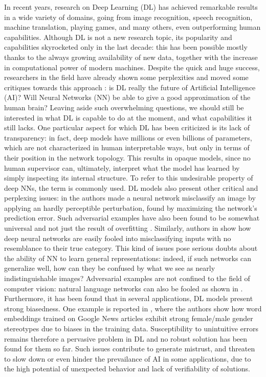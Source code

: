 In recent years, research on Deep Learning (DL) has achieved remarkable results in a wide variety of domains, going from image recognition, speech recognition, machine translation, playing games, and many others, even outperforming human capabilities. Although DL is not a new research topic, its popularity and capabilities skyrocketed only in the last decade: this has been possible mostly thanks to the always growing availability of new data, together with the increase in computational power of modern machines.
Despite the quick and huge success, researchers in the field have already shown some perplexities and moved some critiques towards this approach \cite{marcus2018appraisal,sabour2017dynamic}: is DL really the future of Artificial Intelligence (AI)? Will Neural Networks (NN) be able to give a good approximation of the human brain? Leaving aside such overwhelming questions, we should still be interested in what DL is capable to do at the moment, and what capabilities it still lacks.
One particular aspect for which DL has been criticized is its lack of transparency: in fact, deep models have millions or even billions of parameters, which are not characterized in human interpretable ways, but only in terms of their position in the network topology. This results in opaque models, since no human supervisor can, ultimately, interpret what the model has learned by simply inspecting its internal structure. To refer to this undesirable property of deep NNs, the term  is commonly used. DL models also present other critical and perplexing issues: in \cite{szegedy2013intriguing} the authors made a neural network misclassify an image by applying an hardly perceptible perturbation, found by maximizing the network’s prediction error. Such adversarial examples have also been found to be somewhat universal and not just the result of overfitting \cite{buckner2020adversarial}. Similarly, authors in \cite{nguyen2015fooled} show how deep neural networks are easily fooled into misclassifying inputs with no resemblance to their true category. This kind of issues pose serious doubts about the ability of NN to learn general representations: indeed, if such networks can generalize well, how can they be confused by what we see as nearly indistinguishable images?  Adversarial examples are not confined to the field of computer vision: natural language networks can also be fooled as shown in \cite{jia2017adversarial,zhang2019generating}. Furthermore, it has been found that in several applications, DL models present strong biasedness. One example is reported in \cite{bolukbasi2016debiasing}, where the authors show how word embeddings trained on Google News articles exhibit strong female/male gender stereotypes due to biases in the training data. Susceptibility to unintuitive errors remains therefore a pervasive problem in DL and no robust solution has been found for them so far. Such issues contribute to generate mistrust, and threaten to slow down or even hinder the prevailance of AI in some applications, due to the high potential of unexpected behavior and lack of verifiability of solutions.
